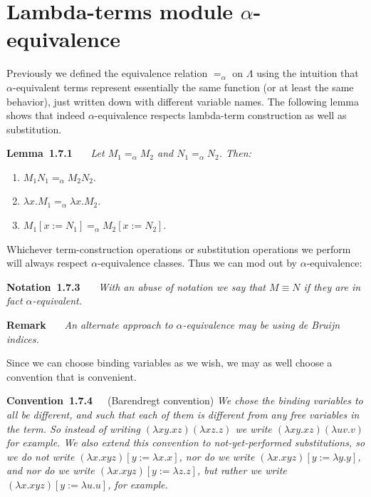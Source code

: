 \documentclass[letterpaper]{article}
\newenvironment{lemma}[2][]{\par\medskip
	\noindent \textbf{Lemma~#2}~~~#1 \rmfamily\em}{\medskip}
\newenvironment{remarkNonNum}[1][]{\par\medskip
	\noindent \textbf{Remark}~~~#1 \rmfamily\em}{\medskip}
\newenvironment{notation}[2][]{\par\medskip
	\noindent \textbf{Notation~#2}~~~#1 \rmfamily\em}{\medskip}
\newenvironment{convention}[2][]{\par\medskip
	\noindent \textbf{Convention~#2}~~~#1 \rmfamily\em}{\medskip}
\renewcommand{\l}{\lambda}
\newcommand{\aeq}{=_\alpha}
\begin{document}

\section{Lambda-terms module $\alpha$-equivalence}
Previously we defined the equivalence relation $\aeq$ on $\Lambda$ using the intuition that $\alpha$-equivalent terms represent essentially the same function (or at least the same behavior), just written down with different variable names. The following lemma shows that indeed $\alpha$-equivalence respects lambda-term construction as well as substitution.

\begin{lemma}{1.7.1}
	Let $M_1 \aeq M_2$ and $N_1 \aeq N_2$. Then:
	\begin{enumerate}
		\item $M_1 N_1 \aeq M_2 N_2$.
		\item $\l x. M_1 \aeq \l x . M_2$.
		\item $M_1[x := N_1] \aeq M_2[x := N_2]$.
	\end{enumerate}
\end{lemma}

Whichever term-construction operations or substitution operations we perform will always respect $\alpha$-equivalence classes. Thus we can mod out by $\alpha$-equivalence:

\begin{notation}{1.7.3}
	With an abuse of notation we say that $M \equiv N$ if they are in fact $\alpha$-equivalent.
\end{notation}

\begin{remarkNonNum}
	An alternate approach to $\alpha$-equivalence may be using de Bruijn indices.
\end{remarkNonNum}

Since we can choose binding variables as we wish, we may as well choose a convention that is convenient.

\begin{convention}[(Barendregt convention)]{1.7.4}
	We chose the binding variables to all be different, and such that each of them is different from any free variables in the term. So instead of writing $(\l x y . x z)(\l x z . z)$ we write $(\l x y. x z)(\l u v . v)$ for example. We also extend this convention to not-yet-performed substitutions, so we do not write $(\l x .  x y z)[y := \l x.x]$, nor do we write $(\l x .  x y z)[y := \l y.y]$, and nor do we write $(\l x .  x y z)[y := \l z.z]$, but rather we write $(\l x .  x y z)[y := \l u.u]$, for example.
\end{convention}
\end{document}
